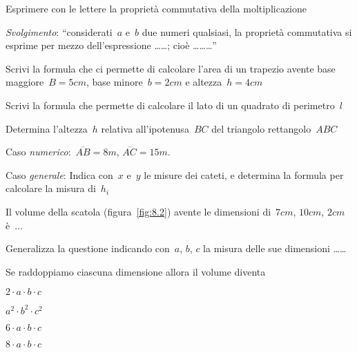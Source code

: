 \begin{esercizio}
\label{ese:8.6}
Esprimere con le lettere la proprietà commutativa della moltiplicazione

\emph{Svolgimento}: ``considerati~$a$ e~$b$ due numeri qualsiasi, la proprietà 
commutativa si esprime per mezzo dell'espressione \ldots\ldots; 
cioè \ldots\ldots\ldots''
\end{esercizio}

\begin{multicols}{2}
\begin{esercizio}
\label{ese:8.7}
Scrivi la formula che ci permette di calcolare l'area di un trapezio avente 
base maggiore~$B=5\unit{cm}$, base minore~$b=2\unit{cm}$ e 
altezza~$h=4\unit{cm}$
\end{esercizio}

\begin{esercizio}
\label{ese:8.8}
Scrivi la formula che permette di calcolare il lato di un quadrato di 
perimetro~$l$
\end{esercizio}

\begin{esercizio}
\label{ese:8.9}
Determina l'altezza~$h$ relativa all'ipotenusa~$BC$ del triangolo 
rettangolo~$ABC$

Caso \emph{numerico}:~$\overline{AB}=8\unit{m}$, $\overline{AC}=15\unit{m}.$

Caso \emph{generale}: Indica con~$x$ e~$y$ le misure dei cateti, e determina 
la formula per calcolare la misura di~$h_i$
\end{esercizio}

\begin{esercizio}
\label{ese:8.10}
Il volume della scatola (figura~\ref{fig:8.2}) avente le dimensioni 
di~$7\unit{cm}$, $10\unit{cm}$, $2\unit{cm}$ è~$\ldots$

Generalizza la questione indicando con~$a$, $b$, $c$ la misura delle sue 
dimensioni \ldots\ldots

Se raddoppiamo ciascuna dimensione allora il volume diventa
 \begin{enumeratea}
 \item $2\cdot a\cdot b\cdot c$
 \item $a^{2}\cdot b^{2}\cdot c^{2}$
 \item $6\cdot a\cdot b\cdot c$
 \item $8\cdot a\cdot b\cdot c$
 \end{enumeratea}
\end{esercizio}



\end{multicols}

